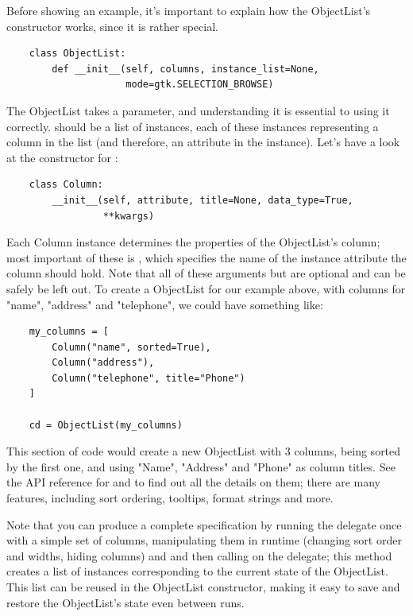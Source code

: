 \documentclass[a4paper]{howto}
\begin{document}
Before showing an example, it's important to explain how the
ObjectList's constructor works, since it is rather special.

    \begin{verbatim}
    class ObjectList:
        def __init__(self, columns, instance_list=None,
                     mode=gtk.SELECTION_BROWSE)
    \end{verbatim}

The ObjectList takes a  parameter, and understanding it
is essential to using it correctly.  should be a list of
 instances, each of these instances representing a column
in the list (and therefore, an attribute in the instance). Let's have a
look at the constructor for :

    \begin{verbatim}
    class Column:
        __init__(self, attribute, title=None, data_type=True,
                 **kwargs)
    \end{verbatim}

Each Column instance determines the properties of the ObjectList's column;
most important of these is , which specifies the name of
the instance attribute the column should hold. Note that all of these
arguments but  are optional and can be safely be left
out. To create a ObjectList for our example above, with columns for "name",
"address" and "telephone", we could have something like:

    \begin{verbatim}
    my_columns = [
        Column("name", sorted=True),
        Column("address"),
        Column("telephone", title="Phone")
    ]

    cd = ObjectList(my_columns)
    \end{verbatim}

This section of code would create a new ObjectList with 3 columns,
being sorted by the first one, and using "Name", "Address" and "Phone"
as column titles. See the API reference for  and
 to find out all the details on them; there are many
features, including sort ordering, tooltips, format strings and more.

Note that you can produce a complete  specification by
running the delegate once with a simple set of columns, manipulating
them in runtime (changing sort order and widths, hiding columns) and and
then calling  on the delegate; this method creates
a list of  instances corresponding to the current state of
the ObjectList. This list can be reused in the ObjectList constructor,
making it easy to save and restore the ObjectList's state even between runs.
\end{document}
